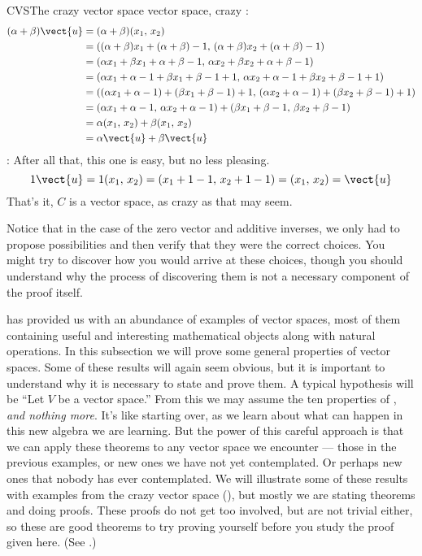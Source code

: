 \begin{example}{CVS}{The crazy vector space }{vector space, crazy}
%
:
%
\begin{align*}
(\alpha+\beta)\vect{u}&=(\alpha+\beta)(x_1,\,x_2)\\
&=((\alpha+\beta)x_1+(\alpha+\beta)-1,\,(\alpha+\beta)x_2+(\alpha+\beta)-1)\\
&=(\alpha x_1+\beta x_1+\alpha+\beta-1,\,\alpha x_2+\beta x_2+\alpha+\beta-1)\\
&=(\alpha x_1+\alpha-1+\beta x_1+\beta-1+1,\,\alpha x_2+\alpha-1+\beta x_2+\beta-1+1)\\
&=((\alpha x_1+\alpha-1)+(\beta x_1+\beta-1)+1,\,(\alpha x_2+\alpha-1)+(\beta x_2+\beta-1)+1)\\
&=(\alpha x_1+\alpha-1,\,\alpha x_2+\alpha-1)+(\beta x_1+\beta-1,\,\beta x_2+\beta-1)\\
&=\alpha(x_1,\,x_2)+\beta(x_1,\,x_2)\\
&=\alpha\vect{u}+\beta\vect{u}
\end{align*}
%
:  After all that, this one is easy, but no less pleasing.
%
\begin{equation*}
1\vect{u}=1(x_1,\,x_2)=(x_1+1-1,\,x_2+1-1)=(x_1,\,x_2)=\vect{u}
\end{equation*}
%
That's it, $C$ is a vector space, as crazy as that may seem.\par
%
Notice that in the case of the zero vector and additive inverses, we only had to propose possibilities and then verify that they were the correct choices.  You might try to discover how you would arrive at these choices, though you should understand why the process of discovering them is not a necessary component of the proof itself.
\end{example}
%
%
 has provided us with an abundance of examples of vector spaces, most of them containing useful and interesting mathematical objects along with natural operations.  In this subsection we will prove some general properties of vector spaces.  Some of these results will again seem obvious, but it is important to understand why it is necessary to state and prove them.  A typical hypothesis will be ``Let $V$ be a vector space.''  From this we may assume the ten properties of , {\em and nothing more}.  It's like starting over, as we learn about what can happen in this new algebra we are learning.  But the power of this careful approach is that we can apply these theorems to any vector space we encounter --- those in the previous examples, or new ones we have not yet contemplated.  Or perhaps new ones that nobody has ever contemplated.  We will illustrate some of these results with examples from the crazy vector space (), but mostly we are stating theorems and doing proofs.  These proofs do not get too involved, but are not trivial either, so these are good theorems to try proving yourself before you study the proof given here.  (See .)\par
